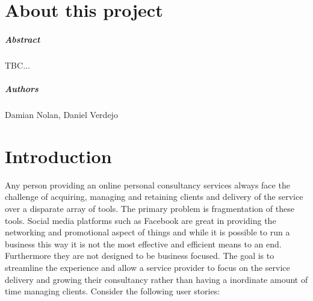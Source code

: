 
\chapter*{About this project}
\paragraph{Abstract}

TBC...

\paragraph{Authors}
Damian Nolan, Daniel Verdejo



\chapter{Introduction}
Any person providing an online personal consultancy services always face the challenge of acquiring, managing and retaining clients and delivery of the service over a disparate array of tools.  The primary problem is fragmentation of these tools.  Social media platforms such as Facebook are great in providing the networking and promotional aspect of things and while it is possible to run a business this way it is not the most effective and efficient means to an end.  Furthermore they are not designed to be business focused.
The goal is to streamline the experience and allow a service provider to focus on the service delivery and growing their consultancy rather than having a inordinate amount of time managing clients. Consider the following user stories:

